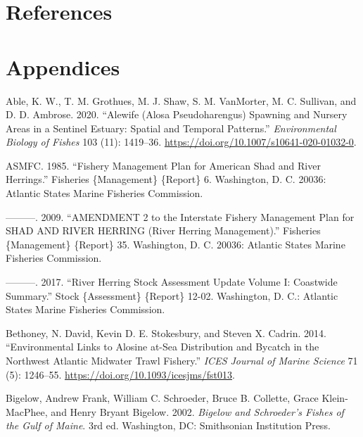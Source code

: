 \documentclass[
]{book}
\newlength{\cslhangindent}
\newlength{\cslentryspacingunit} %
\newenvironment{CSLReferences}[2] %
 {%
  \setlength{\parindent}{0pt}
  \ifodd #1
  \let\oldpar\par
  \def\par{\hangindent=\cslhangindent\oldpar}
  \fi
  \setlength{\parskip}{#2\cslentryspacingunit}
 }%
 {}
\begin{document}
\hypertarget{references}{%
\chapter*{References}\label{references}}

\hypertarget{appendices}{%
\chapter*{Appendices}\label{appendices}}

\hypertarget{refs}{}
\begin{CSLReferences}{1}{0}
\leavevmode{}%
Able, K. W., T. M. Grothues, M. J. Shaw, S. M. VanMorter, M. C. Sullivan, and D. D. Ambrose. 2020. {``Alewife ({Alosa} Pseudoharengus) Spawning and Nursery Areas in a Sentinel Estuary: Spatial and Temporal Patterns.''} \emph{Environmental Biology of Fishes} 103 (11): 1419--36. \url{https://doi.org/10.1007/s10641-020-01032-0}.

\leavevmode{}%
ASMFC. 1985. {``Fishery {Management} {Plan} for {American} {Shad} and {River} {Herrings}.''} Fisheries \{Management\} \{Report\} 6. Washington, D. C. 20036: Atlantic States Marine Fisheries Commission.

\leavevmode{}%
---------. 2009. {``{AMENDMENT} 2 to the {Interstate} {Fishery} {Management} {Plan} for {SHAD} {AND} {RIVER} {HERRING} ({River} {Herring} {Management}).''} Fisheries \{Management\} \{Report\} 35. Washington, D. C. 20036: Atlantic States Marine Fisheries Commission.

\leavevmode{}%
---------. 2017. {``River {Herring} {Stock} {Assessment} {Update} {Volume} {I}: {Coastwide} {Summary}.''} Stock \{Assessment\} \{Report\} 12-02. Washington, D. C.: Atlantic States Marine Fisheries Commission.

\leavevmode{}%
Bethoney, N. David, Kevin D. E. Stokesbury, and Steven X. Cadrin. 2014. {``Environmental Links to Alosine at-Sea Distribution and Bycatch in the {Northwest} {Atlantic} Midwater Trawl Fishery.''} \emph{ICES Journal of Marine Science} 71 (5): 1246--55. \url{https://doi.org/10.1093/icesjms/fst013}.

\leavevmode{}%
Bigelow, Andrew Frank, William C. Schroeder, Bruce B. Collette, Grace Klein-MacPhee, and Henry Bryant Bigelow. 2002. \emph{Bigelow and {Schroeder}'s Fishes of the {Gulf} of {Maine}}. 3rd ed. Washington, DC: Smithsonian Institution Press.


\end{CSLReferences}
\end{document}
